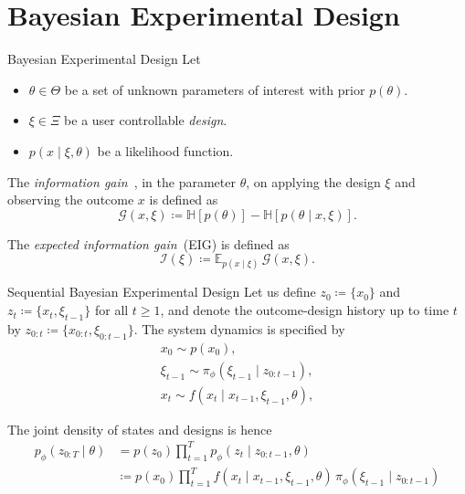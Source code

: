 \documentclass[10pt, aspectratio=1610]{beamer}
\begin{document}
    \section{Bayesian Experimental Design}
    \begin{frame}{Bayesian Experimental Design}
      Let
      \begin{itemize}
        \item $\theta \in \Theta$ be a set of unknown parameters of interest with prior $p(\theta)$.
        \item $\xi \in \Xi$ be a user controllable \emph{design}.
        \item $p(x \mid \xi, \theta)$ be a likelihood function.
      \end{itemize}
      
      \pause
      \begin{definition}
        The \emph{information gain}~\citep[IG,][]{lindley1956measure}, in the parameter $\theta$, on applying the design $\xi$ and observing the outcome $x$ is defined as
        \begin{equation}\label{eq:ig_single_experiment}
          \mathcal{G}(x, \xi) \coloneq \mathbb{H}[p(\theta)] - \mathbb{H}[p(\theta\mid x, \xi)].
        \end{equation}
      \end{definition}

      \pause
      \begin{definition}
        The \emph{expected information gain}~(EIG) is defined as
        \begin{equation}
          \mathcal{I}(\xi) \coloneq \mathbb{E}_{p(x \mid \xi)} \, \mathcal{G}(x, \xi).
        \end{equation}
      \end{definition}
    \end{frame}

    \begin{frame}{Sequential Bayesian Experimental Design}
      Let us define $z_0 \coloneq \{x_0\}$ and $z_{t} \coloneq \{x_t, \xi_{t-1}\}$ for all $t \geq 1$, and denote the outcome-design history up to time $t$ by $z_{0:t} \coloneq \{x_{0:t}, \xi_{0:t-1}\}$. The system dynamics is specified by
      \begin{gather}
        x_0 \sim p(x_0), \\
        \xi_{t-1} \sim \pi_\phi(\xi_{t-1} \mid z_{0:t-1}), \\
        x_t \sim f(x_t \mid x_{t-1}, \xi_{t-1}, \theta),
      \end{gather}
      \pause

      \vspace{0.2cm}
      The joint density of states and designs is hence
      \begin{align}\label{eq:joint_density}
        p_{\phi}(z_{0:T} \mid \theta) &= p(z_{0}) \prod_{t=1}^T p_{\phi}(z_{t} \mid z_{0:t-1}, \theta) \\
        &\coloneq p(x_0) \prod_{t=1}^T f(x_t \mid x_{t-1}, \xi_{t-1}, \theta) \, \pi_\phi(\xi_{t-1} \mid z_{0:t-1})
      \end{align}
    \end{frame}
\end{document}
